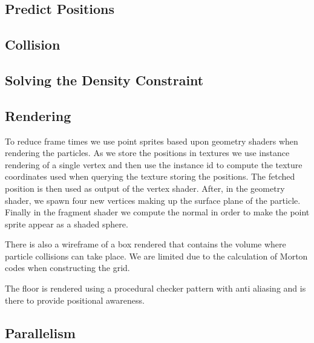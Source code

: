

\subsection{Predict Positions}


\subsection{Collision}


\subsection{Solving the Density Constraint}


\subsection{Rendering}
To reduce frame times we use point sprites based upon geometry shaders when rendering the particles. As we store the positions in textures we use instance rendering of a single vertex and then use the instance id to compute the texture coordinates used when querying the texture storing the positions. The fetched position is then used as output of the vertex shader. After, in the geometry shader, we spawn four new vertices making up the surface plane of the particle. Finally in the fragment shader we compute the normal in order to make the point sprite appear as a shaded sphere.

There is also a wireframe of a box rendered that contains the volume where particle collisions can take place. We are limited due to the calculation of Morton codes when constructing the grid. 

The floor is rendered using a procedural checker pattern with anti aliasing and is there to provide positional awareness.


\subsection{Parallelism}

